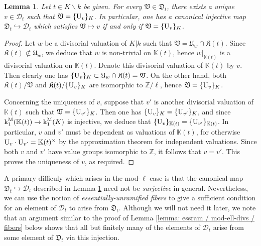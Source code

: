 \documentclass[11pt]{amsart}
\newtheorem{lemma}[proposition]{Lemma}
\theoremstyle{definition}
\theoremstyle{remark}
\numberwithin{equation}{section}
\newcommand{\Z}{\mathbb{Z}}
\newcommand{\U}{{\rm U}}
\newcommand{\Kbb}{\mathbb{K}}
\newcommand{\Dcal}{\mathscr{D}}
\newcommand{\Kfrak}{\mathfrak{K}}
\newcommand{\Ufrak}{\mathfrak{U}}
\newcommand{\Dfrak}{\mathfrak{D}}
\newcommand{\Vfrak}{\mathfrak{V}}
\renewcommand{\k}{\operatorname{k}^{\rm M}}
\begin{document}
\begin{lemma}
\label{lemma: essram / mod-ell-divs / mod-ell-div-injection}
  Let $t \in K \smallsetminus k$ be given.
  For every $\Vfrak \in \Dfrak_t$, there exists a unique $v \in \Dcal_t$ such that $\Vfrak = \{\U_v\}_K$.
  In particular, one has a canonical injective map $\Dfrak_t \hookrightarrow \Dcal_t$ which satisfies $\Vfrak \mapsto v$ if and only if $\Vfrak = \{\U_v\}_K$.
\end{lemma}
\begin{proof}
  Let $w$ be a divisorial valuation of $K|k$ such that $\Vfrak = \Ufrak_w \cap \Kfrak(t)$.
  Since $\Kfrak(t) \not\subset \Ufrak_w$, we deduce that $w$ is non-trivial on $\Kbb(t)$, hence $w|_{\Kbb(t)}$ is a divisorial valuation on $\Kbb(t)$.
  Denote this divisorial valuation of $\Kbb(t)$ by $v$.
  Then clearly one has $\{\U_v\}_K \subset \Ufrak_w \cap \Kfrak(t) = \Vfrak$.
  On the other hand, both $\Kfrak(t)/\Vfrak$ and $\Kfrak(t)/\{\U_v\}_K$ are isomorphic to $\Z/\ell$, hence $\Vfrak = \{\U_v\}_K$.

  Concerning the uniqueness of $v$, suppose that $v'$ is another divisorial valuation of $\Kbb(t)$ such that $\Vfrak = \{\U_{v'}\}_K$.
  Then one has $\{\U_v\}_K = \{\U_{v'}\}_K$, and since $\k_1(\Kbb(t)) \rightarrow \k_1(K)$ is injective, we deduce that $\{\U_v\}_{\Kbb(t)} = \{\U_{v'}\}_{\Kbb(t)}$.
  In particular, $v$ and $v'$ must be dependent as valuations of $\Kbb(t)$, for otherwise $\U_v \cdot \U_{v'} = \Kbb(t)^\times$ by the approximation theorem for independent valuations.
  Since both $v$ and $v'$ have value groups isomorphic to $\Z$, it follows that $v = v'$.
  This proves the uniqueness of $v$, as required.
\end{proof}

A primary difficuly which arises in the mod-$\ell$ case is that the canonical map $\Dfrak_t \hookrightarrow \Dcal_t$ described in Lemma \ref{lemma: essram / mod-ell-divs / mod-ell-div-injection} need not be \emph{surjective} in general.
Nevertheless, we can use the notion of \emph{essentially-unramified fibers} to give a sufficient condition for an element of $\Dcal_t$ to arise from $\Dfrak_t$.
Although we will not need it later, we note that an argument similar to the proof of Lemma \ref{lemma: essram / mod-ell-divs / fibers} below shows that all but finitely many of the elements of $\Dcal_t$ arise from some element of $\Dfrak_t$ via this injection.
\end{document}
